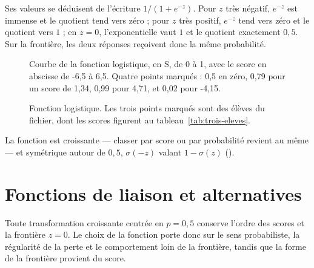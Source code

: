 Ses valeurs se déduisent de l'écriture $1/(1+e^{-z})$. Pour $z$ très négatif,
$e^{-z}$ est immense et le quotient tend vers zéro ; pour $z$ très positif,
$e^{-z}$ tend vers zéro et le quotient vers $1$ ; en $z=0$, l'exponentielle vaut
$1$ et le quotient exactement $0{,}5$. Sur la frontière, les deux réponses
reçoivent donc la même probabilité.

\begin{figure}[htbp]
\centering
\begin{graphique}{Courbe de la fonction logistique, en S, de 0 à 1, avec le score en abscisse de -6,5 à 6,5. Quatre points marqués : 0,5 en zéro, 0,79 pour un score de 1,34, 0,99 pour 4,71, et 0,02 pour -4,15.}
\end{graphique}
\caption{Fonction logistique. Les trois points marqués sont des élèves du
fichier, dont les scores figurent au tableau~\ref{tab:trois-eleves}.}
\label{fig:sigmoide-emploi}
\end{figure}

La fonction est croissante --- classer par score ou par probabilité revient au
même --- et symétrique autour de $0{,}5$, $\sigma(-z)$ valant $1-\sigma(z)$
().

\section{Fonctions de liaison et alternatives}

Toute transformation croissante centrée en $p=0{,}5$ conserve l'ordre des
scores et la frontière $z=0$. Le choix de la fonction porte donc sur le sens
probabiliste, la régularité de la perte et le comportement loin de la frontière,
tandis que la forme de la frontière provient du score.

